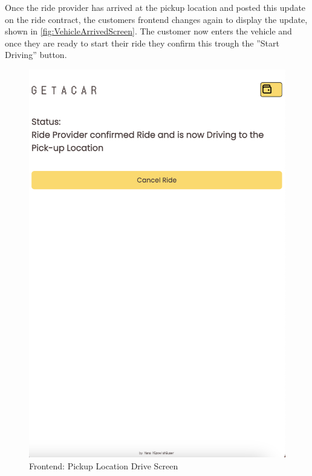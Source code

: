 Once the ride provider has arrived at the pickup location and posted this update on the ride contract, the customers frontend changes again to display the update, shown in \ref{fig:VehicleArrivedScreen}. The customer now enters the vehicle and once they are ready to start their ride they confirm this trough the ''Start Driving'' button.


\begin{figure}[H]
    \centering
    
    \begin{minipage}{0.45\linewidth}
        \centering
        \includegraphics[width=\linewidth]{data/ffss/7.png}
        \caption{Frontend: Pickup Location Drive Screen}
        \label{fig:PickupLocationDriveScreen}
    \end{minipage}

\end{figure}
